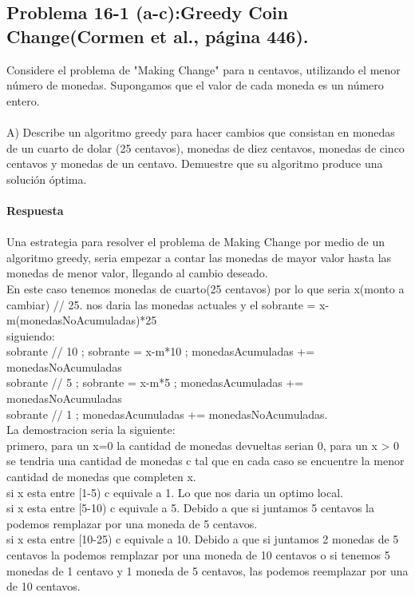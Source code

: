 \documentclass[a4paper,12pt]{article}
\begin{document}
\subsection{Problema 16-1 (a-c):Greedy Coin Change(Cormen et al., página 446).}
Considere el problema de "Making Change" para n centavos, utilizando el menor número de monedas. Supongamos que el valor de cada moneda es un número entero.\\\\
A) Describe un algoritmo greedy para hacer cambios que consistan en monedas de un cuarto de dolar (25 centavos), monedas de diez centavos, monedas de cinco centavos y monedas de un centavo. Demuestre que su algoritmo produce una solución óptima.\\\\
\textbf{Respuesta}\\\\
Una estrategia para resolver el problema de Making Change por medio de un algoritmo greedy, seria empezar a contar las monedas de mayor valor hasta las monedas de menor valor, llegando al cambio deseado.\\
En este caso tenemos monedas de cuarto(25 centavos) por lo que seria x(monto a cambiar) // 25. nos daria las monedas actuales y el sobrante = x-m(monedasNoAcumuladas)*25\\
siguiendo:\\
sobrante // 10 ; sobrante = x-m*10 ; monedasAcumuladas += monedasNoAcumuladas\\
sobrante // 5 ; sobrante = x-m*5 ; monedasAcumuladas += monedasNoAcumuladas\\
sobrante // 1 ; monedasAcumuladas += monedasNoAcumuladas.\\
La demostracion seria la siguiente:\\
primero, para un x=0 la cantidad de monedas devueltas serian 0, para un x > 0 se tendria una cantidad de monedas c tal que en cada caso se encuentre la menor cantidad de monedas que completen x.\\
si x esta entre [1-5) c equivale a 1. Lo que nos daria un optimo local.\\
si x esta entre [5-10) c equivale a 5. Debido a que si juntamos 5 centavos la podemos remplazar por una moneda de 5 centavos.\\
si x esta entre [10-25) c equivale a 10. Debido a que si juntamos 2 monedas de  5 centavos la podemos remplazar por una moneda de 10 centavos o si tenemos 5 monedas de 1 centavo y 1 moneda de 5 centavos, las podemos reemplazar por una de 10 centavos.\\
\end{document}
